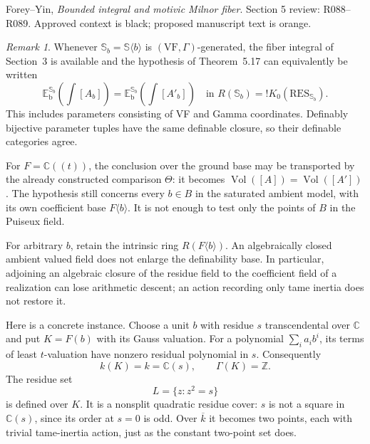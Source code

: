 \documentclass[12pt]{amsart}
\theoremstyle{remark}
\newtheorem{rem}[thm]{Remark}
\theoremstyle{definition}
\newcommand{\C}{\mathds{C}}
\newcommand{\RES}{\mathrm{RES}}
\newcommand{\VF}{\mathrm{VF}}
\newcommand{\Z}{\mathds{Z}}
\newcommand{\Sbase}{\mathbb S}
\numberwithin{equation}{section}
\newcommand{\Vol}{\operatorname{Vol}}
\theoremstyle{plain}
\newcommand{\Sfiber}{\mathbb S_b}
\newcommand{\Rbase}[1]{{!K_0(\RES_{#1})}}
\begin{document}
\setcounter{section}{5}
\setcounter{subsection}{2}
\setcounter{thm}{17}
{\small\noindent Forey--Yin, \emph{Bounded integral and motivic Milnor fiber}.
Section 5 review: R088--R089.
Approved context is black; proposed manuscript text is orange.}
\medskip

\begin{rem}\label{rem:volb}
Whenever $\Sfiber=\Sbase\langle b\rangle$ is
$(\VF,\Gamma)$-generated, the fiber integral of Section~3 is
available and the hypothesis of Theorem~5.17 can equivalently
be written
\[
 \mathbb E_{\mathrm b}^{\Sfiber}\!
       \left(\int[A_b]\right)
 =
 \mathbb E_{\mathrm b}^{\Sfiber}\!
       \left(\int[A'_b]\right)
 \quad\text{in }R(\Sfiber)=\Rbase{\Sfiber}.
\]
This includes parameters consisting of VF and Gamma
coordinates. Definably bijective parameter tuples have the
same definable closure, so their definable categories agree.

{\color{ProposalOrange}
For $F=\C((t))$, the conclusion over the ground base may be
transported by the already constructed comparison $\Theta$:
it becomes $\Vol([A])=\Vol([A'])$.
The hypothesis still concerns every $b\in B$ in the
saturated ambient model, with its own coefficient base
$F\langle b\rangle$.
It is not enough to test only the points of $B$ in the
Puiseux field.

For arbitrary $b$, retain the intrinsic ring
$R(F\langle b\rangle)$.
An algebraically closed ambient valued field does not enlarge
the definability base.
In particular, adjoining an algebraic closure of the residue
field to the coefficient field of a realization can lose
arithmetic descent; an action recording only tame inertia
does not restore it.

Here is a concrete instance.
Choose a unit $b$ with residue $s$ transcendental over $\C$
and put $K=F(b)$ with its Gauss valuation.
For a polynomial $\sum_i a_i b^i$, its terms of least
$t$-valuation have nonzero residual polynomial in $s$.
Consequently
\[
 k(K)=k=\C(s),\qquad \Gamma(K)=\Z.
\]
The residue set
\[
 L=\{z:z^2=s\}
\]
is defined over $K$.
It is a nonsplit quadratic residue cover: $s$ is not a square
in $\C(s)$, since its order at $s=0$ is odd.
Over $\overline{k}$ it becomes two points, each with trivial
tame-inertia action, just as the constant two-point set does.

}
\end{rem}
\end{document}
